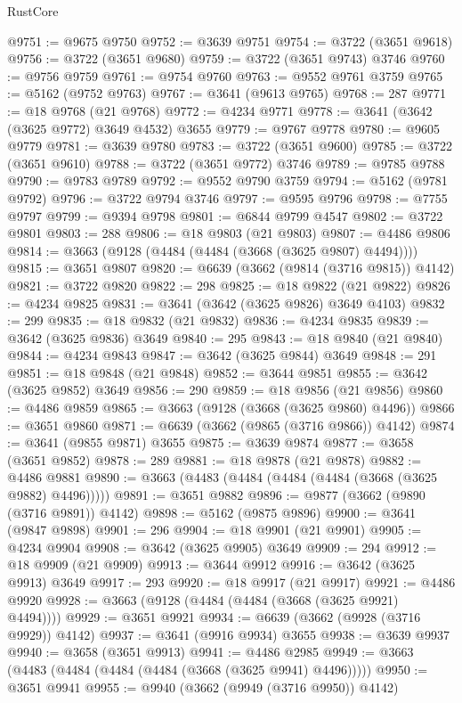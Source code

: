 \begin{lexlean}{RustCore}
\begin{coremodule}
@9751 := @9675 @9750
@9752 := @3639 @9751
@9754 := @3722 (@3651 @9618)
@9756 := @3722 (@3651 @9680)
@9759 := @3722 (@3651 @9743) @3746
@9760 := @9756 @9759
@9761 := @9754 @9760
@9763 := @9552 @9761 @3759
@9765 := @5162 (@9752 @9763)
@9767 := @3641 (@9613 @9765)
@9768 := 287
@9771 := @18 @9768 (@21 @9768)
@9772 := @4234 @9771
@9778 := @3641 (@3642 (@3625 @9772) @3649 @4532) @3655
@9779 := @9767 @9778
@9780 := @9605 @9779
@9781 := @3639 @9780
@9783 := @3722 (@3651 @9600)
@9785 := @3722 (@3651 @9610)
@9788 := @3722 (@3651 @9772) @3746
@9789 := @9785 @9788
@9790 := @9783 @9789
@9792 := @9552 @9790 @3759
@9794 := @5162 (@9781 @9792)
@9796 := @3722 @9794 @3746
@9797 := @9595 @9796
@9798 := @7755 @9797
@9799 := @9394 @9798
@9801 := @6844 @9799 @4547
@9802 := @3722 @9801
@9803 := 288
@9806 := @18 @9803 (@21 @9803)
@9807 := @4486 @9806
@9814 := @3663 (@9128 (@4484 (@4484 (@3668 (@3625 @9807) @4494))))
@9815 := @3651 @9807
@9820 := @6639 (@3662 (@9814 (@3716 @9815)) @4142)
@9821 := @3722 @9820
@9822 := 298
@9825 := @18 @9822 (@21 @9822)
@9826 := @4234 @9825
@9831 := @3641 (@3642 (@3625 @9826) @3649 @4103)
@9832 := 299
@9835 := @18 @9832 (@21 @9832)
@9836 := @4234 @9835
@9839 := @3642 (@3625 @9836) @3649
@9840 := 295
@9843 := @18 @9840 (@21 @9840)
@9844 := @4234 @9843
@9847 := @3642 (@3625 @9844) @3649
@9848 := 291
@9851 := @18 @9848 (@21 @9848)
@9852 := @3644 @9851
@9855 := @3642 (@3625 @9852) @3649
@9856 := 290
@9859 := @18 @9856 (@21 @9856)
@9860 := @4486 @9859
@9865 := @3663 (@9128 (@3668 (@3625 @9860) @4496))
@9866 := @3651 @9860
@9871 := @6639 (@3662 (@9865 (@3716 @9866)) @4142)
@9874 := @3641 (@9855 @9871) @3655
@9875 := @3639 @9874
@9877 := @3658 (@3651 @9852)
@9878 := 289
@9881 := @18 @9878 (@21 @9878)
@9882 := @4486 @9881
@9890 := @3663 (@4483 (@4484 (@4484 (@4484 (@3668 (@3625 @9882) @4496)))))
@9891 := @3651 @9882
@9896 := @9877 (@3662 (@9890 (@3716 @9891)) @4142)
@9898 := @5162 (@9875 @9896)
@9900 := @3641 (@9847 @9898)
@9901 := 296
@9904 := @18 @9901 (@21 @9901)
@9905 := @4234 @9904
@9908 := @3642 (@3625 @9905) @3649
@9909 := 294
@9912 := @18 @9909 (@21 @9909)
@9913 := @3644 @9912
@9916 := @3642 (@3625 @9913) @3649
@9917 := 293
@9920 := @18 @9917 (@21 @9917)
@9921 := @4486 @9920
@9928 := @3663 (@9128 (@4484 (@4484 (@3668 (@3625 @9921) @4494))))
@9929 := @3651 @9921
@9934 := @6639 (@3662 (@9928 (@3716 @9929)) @4142)
@9937 := @3641 (@9916 @9934) @3655
@9938 := @3639 @9937
@9940 := @3658 (@3651 @9913)
@9941 := @4486 @2985
@9949 := @3663 (@4483 (@4484 (@4484 (@4484 (@3668 (@3625 @9941) @4496)))))
@9950 := @3651 @9941
@9955 := @9940 (@3662 (@9949 (@3716 @9950)) @4142)

\end{coremodule}
\end{lexlean}
